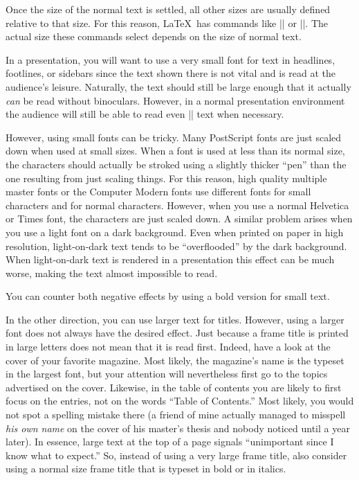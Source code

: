Once the size of the normal text is settled, all other sizes are usually defined relative to that size. For this reason, \LaTeX\ has commands like |\large| or |\small|. The actual size these commands select depends on the size of normal text.

In a presentation, you will want to use a very small font for text in headlines, footlines, or sidebars since the text shown there is not vital and is read at the audience's leisure. Naturally, the text should still be large enough that it actually \emph{can} be read without binoculars. However, in a normal presentation environment the audience will still be able to read even |\tiny| text when necessary.

However, using small fonts can be tricky. Many PostScript fonts are just scaled down when used at small sizes. When a font is used at less than its normal size, the characters should actually be stroked using a slightly thicker ``pen'' than the one resulting from just scaling things. For this reason, high quality multiple master fonts or the Computer Modern fonts use different fonts for small characters and for normal characters. However, when you use a normal Helvetica or Times font, the characters are just scaled down. A similar problem arises when you use a light font on a dark background. Even when printed on paper in high resolution, light-on-dark text tends to be ``overflooded'' by the dark background. When light-on-dark text is rendered in a presentation this effect can be much worse, making the text almost impossible to read.

You can counter both negative effects by using a bold version for small text.

In the other direction, you can use larger text for titles. However, using a larger font does not always have the desired effect. Just because a frame title is printed in large letters does not mean that it is read first. Indeed, have a look at the cover of your favorite magazine. Most likely, the magazine's name is the typeset in the largest font, but your attention will nevertheless first go to the topics advertised on the cover. Likewise, in the table of contents you are likely to first focus on the entries, not on the words ``Table of Contents.'' Most likely, you would not spot a spelling mistake there (a friend of mine actually managed to misspell \emph{his own name} on the cover of his master's thesis and nobody noticed until a year later). In essence, large text at the top of a page signals ``unimportant since I know what to expect.'' So, instead of using a very large frame title, also consider using a normal size frame title that is typeset in bold or in italics.

